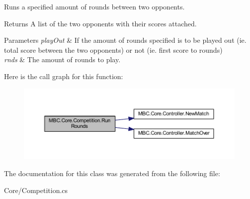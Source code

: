 Runs a specified amount of rounds between two opponents.

\begin{DoxyReturn}{Returns}
A list of the two opponents with their scores attached.
\end{DoxyReturn}

\begin{DoxyParams}{Parameters}
{\em play\-Out} & If the amount of rounds specified is to be played out (ie. total score between the two opponents) or not (ie. first score to rounds)\\
\hline
{\em rnds} & The amount of rounds to play.\\
\hline
\end{DoxyParams}


Here is the call graph for this function\-:
\nopagebreak
\begin{figure}[H]
\begin{center}
\leavevmode
\includegraphics[width=350pt]{class_m_b_c_1_1_core_1_1_competition_ae6f1520c4f77bef9f8b9760b40517857_cgraph}
\end{center}
\end{figure}




The documentation for this class was generated from the following file\-:\begin{DoxyCompactItemize}
\item 
Core/Competition.\-cs\end{DoxyCompactItemize}
